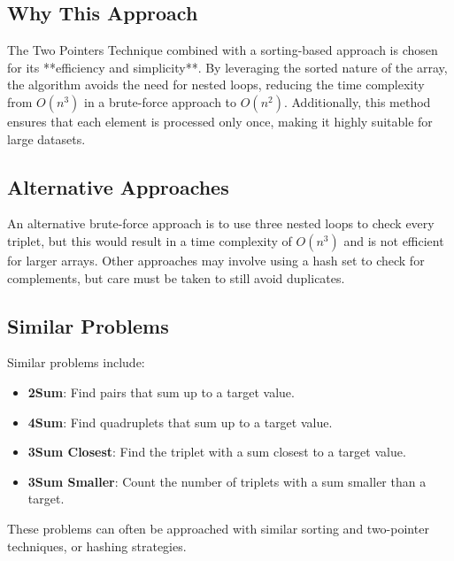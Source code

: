 \subsection*{Why This Approach}

The Two Pointers Technique combined with a sorting-based approach is chosen for its **efficiency and simplicity**. By leveraging the sorted nature of the array, the algorithm avoids the need for nested loops, reducing the time complexity from \( O(n^3) \) in a brute-force approach to \( O(n^2) \). Additionally, this method ensures that each element is processed only once, making it highly suitable for large datasets.

\subsection*{Alternative Approaches}

An alternative brute-force approach is to use three nested loops to check every triplet, but this would result in a time complexity of \( O(n^3) \) and is not efficient for larger arrays. Other approaches may involve using a hash set to check for complements, but care must be taken to still avoid duplicates.

\subsection*{Similar Problems}

Similar problems include:
\begin{itemize}
    \item \textbf{2Sum}: Find pairs that sum up to a target value.
    \item \textbf{4Sum}: Find quadruplets that sum up to a target value.
    \item \textbf{3Sum Closest}: Find the triplet with a sum closest to a target value.
    \item \textbf{3Sum Smaller}: Count the number of triplets with a sum smaller than a target.
\end{itemize}
These problems can often be approached with similar sorting and two-pointer techniques, or hashing strategies.

